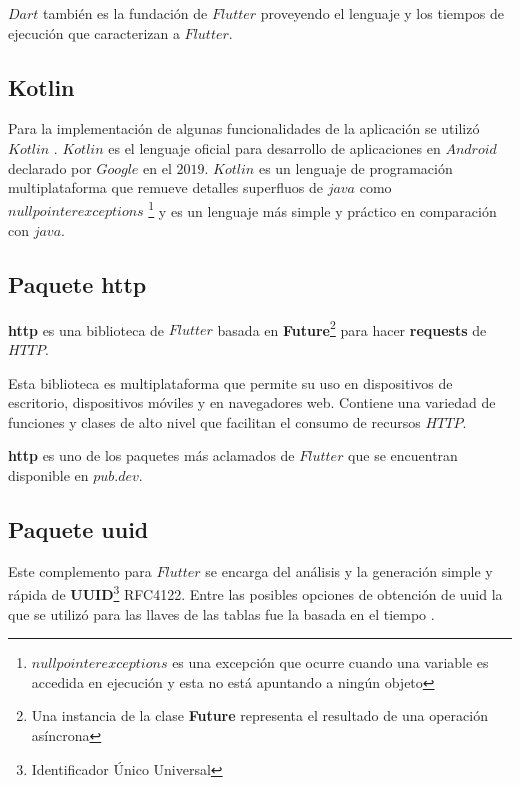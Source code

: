 $Dart$ también es la fundación de $Flutter$ proveyendo el lenguaje y los tiempos de ejecución que caracterizan a $Flutter$.



\subsection{Kotlin}



Para la implementación de algunas funcionalidades de la aplicación se utilizó $Kotlin$ . $Kotlin$ es el lenguaje oficial para desarrollo de aplicaciones en $Android$ declarado por $Google$ en el $2019$. $Kotlin$ es un lenguaje de programación multiplataforma que remueve detalles superfluos de $java$ como $null pointer exceptions$ \footnote{$null pointer exceptions$ es una excepción que ocurre cuando una variable es accedida en ejecución y esta no está apuntando a ningún objeto} y es un lenguaje más simple y práctico en comparación con $java$.




\subsection{Paquete http}

\textbf{http} es una biblioteca de $Flutter$ basada en \textbf{Future}\footnote{Una instancia de la clase \textbf{Future} representa el resultado de una operación asíncrona} para hacer \textbf{requests} de $HTTP$.

Esta biblioteca es multiplataforma que permite su uso en dispositivos de escritorio, dispositivos móviles y en navegadores web. Contiene una variedad de funciones y clases de alto nivel que facilitan el consumo de recursos $HTTP$. 

\textbf{http}  es uno de los paquetes más aclamados de $Flutter$ que se encuentran disponible en $pub.dev$.

\subsection{Paquete uuid}
Este complemento para $Flutter$ se encarga del análisis y la generación simple y rápida de \textbf{UUID}\footnote{Identificador Único Universal}  RFC4122. Entre las posibles opciones de obtención de uuid la que se utilizó para las llaves de las tablas fue la basada en el tiempo . 


